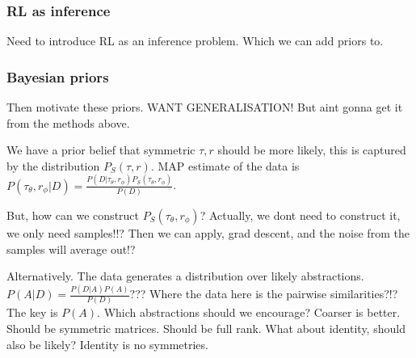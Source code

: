 \subsubsection{RL as inference}

Need to introduce RL as an inference problem. Which we can add priors to.


\subsubsection{Bayesian priors}

Then motivate these priors. WANT GENERALISATION! But aint gonna get it from the
methods above.




We have a prior belief that symmetric $\tau, r$ should be more likely, this is captured by the distribution $P_S(\tau, r)$.
MAP estimate of the data is $P(\tau_{\theta}, r_{\phi}| D) = \frac{P(D | \tau_{\theta}, r_{\phi})P_S(\tau_{\theta}, r_{\phi})}{P(D)}$.

But, how can we construct $P_S(\tau_{\theta}, r_{\phi})$?
Actually, we dont need to construct it, we only need samples!!?
Then we can apply, grad descent, and the noise from the samples will average out!?


Alternatively. The data generates a distribution over likely abstractions.
$P(A|D) = \frac{P(D|A)P(A)}{P(D)}$??? Where the data here is the pairwise similarities?!?
The key is $P(A)$. Which abstractions should we encourage? Coarser is better.
Should be symmetric matrices. Should be full rank. What about identity, should also be likely?
Identity is no symmetries.

%
%
%
%
%
%



